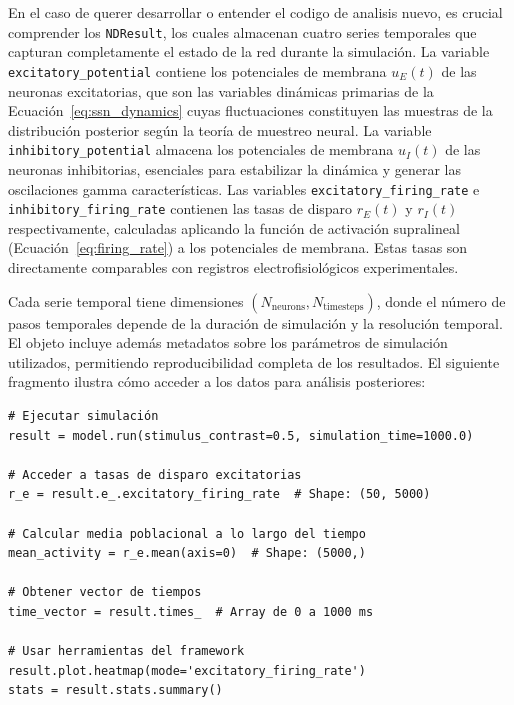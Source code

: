 En el caso de querer desarrollar o entender el codigo de analisis nuevo, es crucial comprender los \texttt{NDResult}, los cuales almacenan cuatro series temporales que capturan completamente el estado de la red durante la simulación. La variable \texttt{excitatory\_potential} contiene los potenciales de membrana $u_E(t)$ de las neuronas excitatorias, que son las variables dinámicas primarias de la Ecuación~\ref{eq:ssn_dynamics} cuyas fluctuaciones constituyen las muestras de la distribución posterior según la teoría de muestreo neural. La variable \texttt{inhibitory\_potential} almacena los potenciales de membrana $u_I(t)$ de las neuronas inhibitorias, esenciales para estabilizar la dinámica y generar las oscilaciones gamma características. Las variables \texttt{excitatory\_firing\_rate} e \texttt{inhibitory\_firing\_rate} contienen las tasas de disparo $r_E(t)$ y $r_I(t)$ respectivamente, calculadas aplicando la función de activación supralineal (Ecuación~\ref{eq:firing_rate}) a los potenciales de membrana. Estas tasas son directamente comparables con registros electrofisiológicos experimentales.

Cada serie temporal tiene dimensiones $(N_{\text{neurons}}, N_{\text{timesteps}})$, donde el número de pasos temporales depende de la duración de simulación y la resolución temporal. El objeto incluye además metadatos sobre los parámetros de simulación utilizados, permitiendo reproducibilidad completa de los resultados. El siguiente fragmento ilustra cómo acceder a los datos para análisis posteriores:

\begin{code}
\begin{verbatim}
# Ejecutar simulación
result = model.run(stimulus_contrast=0.5, simulation_time=1000.0)

# Acceder a tasas de disparo excitatorias
r_e = result.e_.excitatory_firing_rate  # Shape: (50, 5000)

# Calcular media poblacional a lo largo del tiempo
mean_activity = r_e.mean(axis=0)  # Shape: (5000,)

# Obtener vector de tiempos
time_vector = result.times_  # Array de 0 a 1000 ms

# Usar herramientas del framework
result.plot.heatmap(mode='excitatory_firing_rate')
stats = result.stats.summary()
\end{verbatim}
\caption{Acceso a los datos de simulación mediante el objeto \texttt{NDResult}.}
\label{code:ndresult_access}
\end{code}
\vspace{1.5em}

